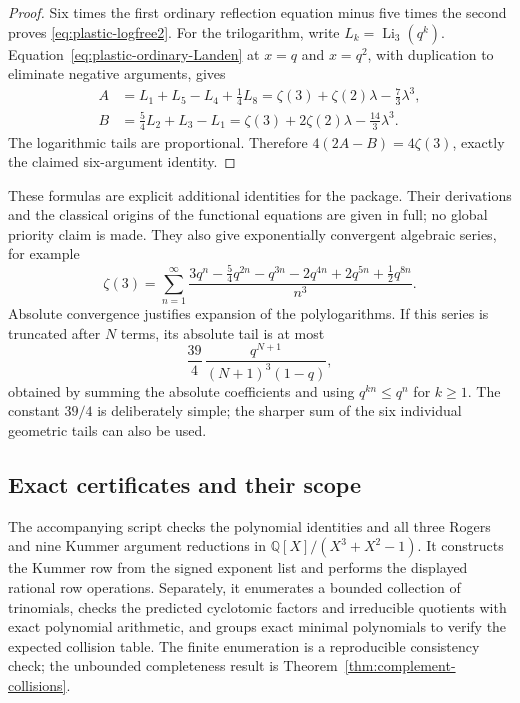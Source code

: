 \begin{proof}
Six times the first ordinary reflection equation minus five times
the second proves \eqref{eq:plastic-logfree2}.
For the trilogarithm, write $L_k=\operatorname{Li}_3(q^k)$.
Equation~\eqref{eq:plastic-ordinary-Landen} at $x=q$ and $x=q^2$,
with duplication to eliminate negative arguments, gives
\begin{align*}
A&=L_1+L_5-L_4+\frac14L_8
  =\zeta(3)+\zeta(2)\lambda-\frac73\lambda^3,\\
B&=\frac54L_2+L_3-L_1
  =\zeta(3)+2\zeta(2)\lambda-\frac{14}3\lambda^3.
\end{align*}
The logarithmic tails are proportional.  Therefore
$4(2A-B)=4\zeta(3)$, exactly the claimed six-argument identity.
\end{proof}

These formulas are explicit additional identities for the package.
Their derivations and the classical origins of the functional
equations are given in full; no global priority claim is made.
They also give exponentially convergent algebraic series, for example
\begin{equation}
\zeta(3)=\sum_{n=1}^{\infty}
\frac{3q^n-\tfrac54q^{2n}-q^{3n}-2q^{4n}
                 +2q^{5n}+\tfrac12q^{8n}}{n^3}.
\label{eq:plastic-zeta3-series}
\end{equation}
Absolute convergence justifies expansion of the polylogarithms.
If this series is truncated after $N$ terms, its absolute tail is
at most
\[
\frac{39}{4}\,
\frac{q^{N+1}}{(N+1)^3(1-q)},
\]
obtained by summing the absolute coefficients and using
$q^{kn}\le q^n$ for $k\ge1$.  The constant $39/4$ is deliberately
simple; the sharper sum of the six individual geometric tails can
also be used.

\subsection{Exact certificates and their scope}

The accompanying script checks the polynomial identities and all
three Rogers and nine Kummer argument reductions in
$\mathbb Q[X]/(X^3+X^2-1)$.  It constructs the Kummer row from the
signed exponent list and performs the displayed rational row
operations.  Separately, it enumerates a bounded collection of
trinomials, checks the predicted cyclotomic factors and irreducible
quotients with exact polynomial arithmetic, and groups exact
minimal polynomials to verify the expected collision table.
The finite enumeration is a reproducible consistency check; the
unbounded completeness result is Theorem~\ref{thm:complement-collisions}.
